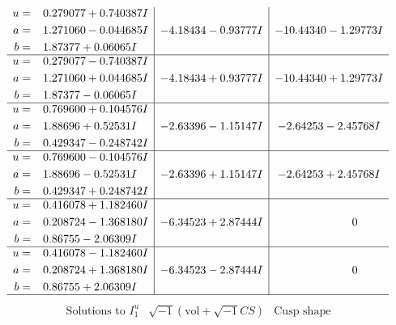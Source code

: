 \documentclass[1p]{elsarticle_modified}
\theoremstyle{definition}
\newcommand{\I}{\sqrt{-1}}
\begin{document}
$$\begin{array}{c|c|c}
\begin{aligned}
u &= \phantom{-}0.279077 + 0.740387 I \\
a &= \phantom{-}1.271060 - 0.044685 I \\
b &= \phantom{-}1.87377 + 0.06065 I\end{aligned}
 & -4.18434 - 0.93777 I & -10.44340 - 1.29773 I \\ \hline\begin{aligned}
u &= \phantom{-}0.279077 - 0.740387 I \\
a &= \phantom{-}1.271060 + 0.044685 I \\
b &= \phantom{-}1.87377 - 0.06065 I\end{aligned}
 & -4.18434 + 0.93777 I & -10.44340 + 1.29773 I \\ \hline\begin{aligned}
u &= \phantom{-}0.769600 + 0.104576 I \\
a &= \phantom{-}1.88696 + 0.52531 I \\
b &= \phantom{-}0.429347 - 0.248742 I\end{aligned}
 & -2.63396 - 1.15147 I & -2.64253 - 2.45768 I \\ \hline\begin{aligned}
u &= \phantom{-}0.769600 - 0.104576 I \\
a &= \phantom{-}1.88696 - 0.52531 I \\
b &= \phantom{-}0.429347 + 0.248742 I\end{aligned}
 & -2.63396 + 1.15147 I & -2.64253 + 2.45768 I \\ \hline\begin{aligned}
u &= \phantom{-}0.416078 + 1.182460 I \\
a &= \phantom{-}0.208724 - 1.368180 I \\
b &= \phantom{-}0.86755 - 2.06309 I\end{aligned}
 & -6.34523 + 2.87444 I & \phantom{-0.000000 } 0 \\ \hline\begin{aligned}
u &= \phantom{-}0.416078 - 1.182460 I \\
a &= \phantom{-}0.208724 + 1.368180 I \\
b &= \phantom{-}0.86755 + 2.06309 I\end{aligned}
 & -6.34523 - 2.87444 I & \phantom{-0.000000 } 0\\
 \hline 
 \end{array}$$\newpage$$\begin{array}{c|c|c}  
\text{Solutions to }I^u_{1}& \I (\text{vol} + \sqrt{-1}CS) & \text{Cusp shape}\\

\end{array}$$
\end{document}
